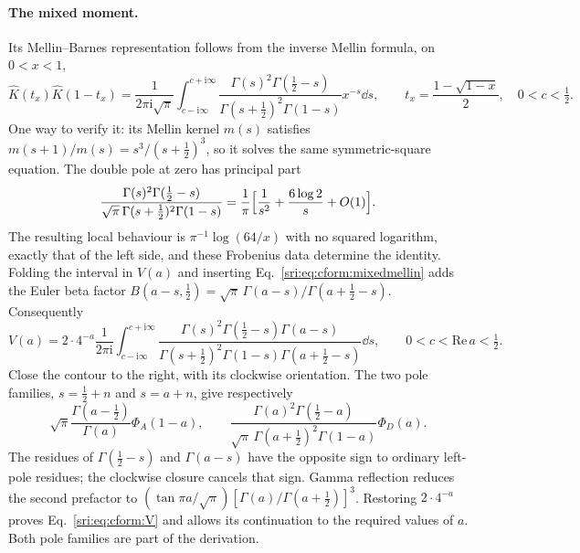 \paragraph{The mixed moment.} Its Mellin--Barnes representation follows from the inverse Mellin formula, on $0<x<1$,
\begin{equation}
 \hat K(t_x)\hat K(1-t_x)=\frac1{2\pi\mathrm i\sqrt\pi}\int_{c-\mathrm i\infty}^{c+\mathrm i\infty}
 \frac{\Gamma(s)^2\Gamma(\frac12-s)}{\Gamma(s+\frac12)^2\Gamma(1-s)}x^{-s}\dd s,\qquad
 t_x=\frac{1-\sqrt{1-x}}2,\quad0<c<\tfrac12.
 \label{sri:eq:cform:mixedmellin}
\end{equation}
One way to verify it: its Mellin kernel $m(s)$ satisfies $m(s+1)/m(s)=s^3/(s+\frac12)^3$, so it solves the same
symmetric-square equation. The double pole at zero has principal part
\begin{equation}
 \frac{\Gamma(s)^2\Gamma(\frac12-s)}{\sqrt\pi\,\Gamma(s+\frac12)^2\Gamma(1-s)}
 =\frac1\pi\Bigl[\frac1{s^2}+\frac{6\log2}{s}+O(1)\Bigr].
\end{equation}
The resulting local behaviour is $\pi^{-1}\log(64/x)$ with no squared logarithm, exactly that of the left side, and
these Frobenius data determine the identity. Folding the interval in $V(a)$ and inserting
Eq.~\eqref{sri:eq:cform:mixedmellin} adds the Euler beta factor $B(a-s,\frac12)=\sqrt\pi\,\Gamma(a-s)/\Gamma(a+\frac12-s)$.
Consequently
\begin{equation}
 V(a)=2\cdot4^{-a}\frac1{2\pi\mathrm i}\int_{c-\mathrm i\infty}^{c+\mathrm i\infty}
 \frac{\Gamma(s)^2\Gamma(\frac12-s)\Gamma(a-s)}{\Gamma(s+\frac12)^2\Gamma(1-s)\Gamma(a+\frac12-s)}\dd s,\qquad
 0<c<\mathrm{Re}\,a<\tfrac12.
\end{equation}
Close the contour to the right, with its clockwise orientation. The two pole families, $s=\frac12+n$ and $s=a+n$, give
respectively
\begin{equation}
 \sqrt\pi\frac{\Gamma(a-\frac12)}{\Gamma(a)}\Phi_A(1-a),\qquad
 \frac{\Gamma(a)^2\Gamma(\frac12-a)}{\sqrt\pi\,\Gamma(a+\frac12)^2\Gamma(1-a)}\Phi_D(a).
\end{equation}
The residues of $\Gamma(\frac12-s)$ and $\Gamma(a-s)$ have the opposite sign to ordinary left-pole residues; the
clockwise closure cancels that sign. Gamma reflection reduces the second prefactor to
$(\tan\pi a/\sqrt\pi)[\Gamma(a)/\Gamma(a+\frac12)]^3$. Restoring $2\cdot4^{-a}$ proves Eq.~\eqref{sri:eq:cform:V} and
allows its continuation to the required values of $a$. Both pole families are part of the derivation.

